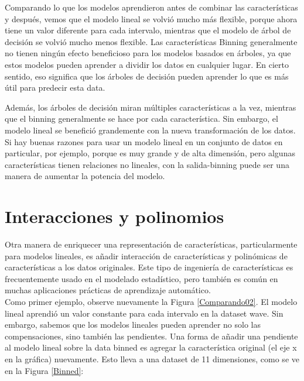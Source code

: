 Comparando lo que los modelos aprendieron antes de combinar las características y después,
 vemos que el modelo lineal se volvió mucho más flexible, porque ahora tiene un valor diferente para cada intervalo, mientras que el modelo de árbol de decisión se volvió mucho menos flexible.
Las características  Binning generalmente no tienen ningún efecto beneficioso para los modelos basados en árboles, ya que estos modelos pueden aprender a dividir los datos en cualquier lugar. En cierto sentido, eso significa que los árboles de decisión pueden aprender lo que es más útil para predecir esta data.
 
Además, los árboles de decisión miran múltiples características a la vez, mientras que el binning generalmente se hace por cada característica. Sin embargo, el modelo lineal se benefició grandemente con la nueva transformación de los datos.\\

Si hay buenas razones para usar un modelo lineal en  un conjunto de datos en particular, por ejemplo, porque es muy grande y de alta dimensión, pero algunas características tienen relaciones no lineales, con la salida-binning puede ser una  manera de aumentar la potencia del modelo. 


\section{Interacciones y polinomios}

Otra manera de enriquecer una representación de características, particularmente para modelos lineales, es añadir  interacción de características  y  polinómicas de características a  los datos originales. Este tipo de ingeniería de características es frecuentemente usado  en el modelado estadístico, pero también es común en muchas aplicaciones prácticas de aprendizaje automático.\\

Como primer ejemplo, observe nuevamente la Figura \ref{Comparando02}. El modelo lineal aprendió un valor constante para cada intervalo en la dataset wave. Sin embargo, sabemos que los modelos lineales pueden aprender no solo las compensaciones, sino también las pendientes.
 Una forma de añadir una pendiente al modelo lineal sobre la data binned es  agregar la característica original (el eje x en la gráfica) nuevamente. Esto lleva a una dataset de  11 dimensiones, como se ve en la Figura \ref{Binned}:	
	

